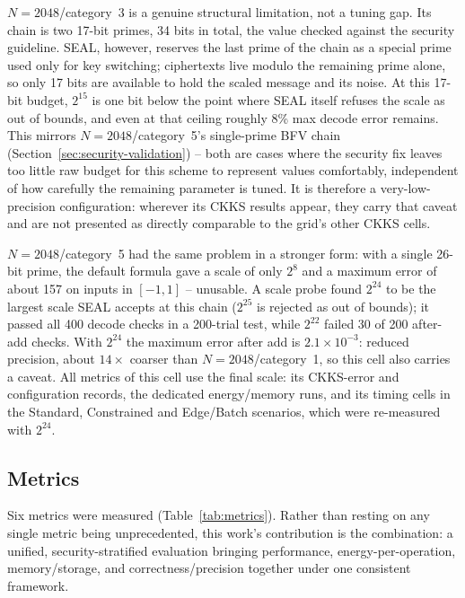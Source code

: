 $N{=}2048$/category~3 is a genuine structural limitation, not a tuning gap. Its chain is two 17-bit primes, 34 bits in total, the value checked against the security guideline. SEAL, however, reserves the last prime of the chain as a special prime used only for key switching; ciphertexts live modulo the remaining prime alone, so only 17 bits are available to hold the scaled message and its noise. At this 17-bit budget, $2^{15}$ is one bit below the point where SEAL itself refuses the scale as out of bounds, and even at that ceiling roughly 8\% max decode error remains. This mirrors $N{=}2048$/category~5's single-prime BFV chain (Section~\ref{sec:security-validation}) -- both are cases where the security fix leaves too little raw budget for this scheme to represent values comfortably, independent of how carefully the remaining parameter is tuned. It is therefore a very-low-precision configuration: wherever its CKKS results appear, they carry that caveat and are not presented as directly comparable to the grid's other CKKS cells.

$N{=}2048$/category~5 had the same problem in a stronger form: with a single 26-bit prime, the default formula gave a scale of only $2^8$ and a maximum error of about 157 on inputs in $[-1,1]$ -- unusable. A scale probe found $2^{24}$ to be the largest scale SEAL accepts at this chain ($2^{25}$ is rejected as out of bounds); it passed all 400 decode checks in a 200-trial test, while $2^{22}$ failed 30 of 200 after-add checks. With $2^{24}$ the maximum error after add is $2.1{\times}10^{-3}$: reduced precision, about $14\times$ coarser than $N{=}2048$/category~1, so this cell also carries a caveat. All metrics of this cell use the final scale: its CKKS-error and configuration records, the dedicated energy/memory runs, and its timing cells in the Standard, Constrained and Edge/Batch scenarios, which were re-measured with $2^{24}$.

\subsection{Metrics}

Six metrics were measured (Table~\ref{tab:metrics}). Rather than resting on any single metric being unprecedented, this work's contribution is the combination: a unified, security-stratified evaluation bringing performance, energy-per-operation, memory/storage, and correctness/precision together under one consistent framework.

